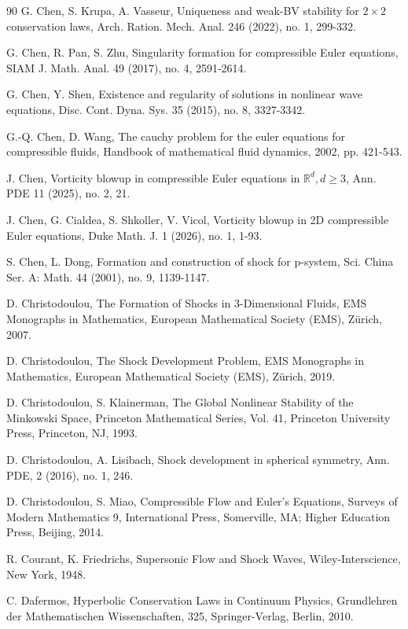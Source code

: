 \documentclass[11pt,reqno]{article}
\numberwithin{equation}{section}
\begin{document}
\begin{thebibliography}{90}
 G. Chen, S. Krupa, A. Vasseur, Uniqueness and weak-BV stability for $2\times2$ conservation laws, Arch. Ration. Mech. Anal. 246 (2022), no. 1, 299-332.

 G. Chen, R. Pan, S. Zhu, Singularity formation for compressible Euler equations, SIAM J. Math. Anal. 49 (2017), no. 4, 2591-2614.

 G. Chen, Y. Shen, Existence and regularity of solutions in nonlinear wave equations, Disc. Cont. Dyna. Sys. 35 (2015), no. 8, 3327-3342.


 G.-Q. Chen, D. Wang, The cauchy problem for the euler equations for compressible fluids, Handbook of mathematical fluid dynamics, 2002, pp. 421-543.

 J. Chen, Vorticity blowup in compressible Euler equations in $\mathbb{R}^d, d\geq3$, Ann. PDE 11 (2025), no. 2, 21.

 J. Chen, G. Cialdea, S. Shkoller, V. Vicol, Vorticity blowup in 2D compressible Euler equations, Duke Math. J. 1 (2026), no. 1, 1-93.

 S. Chen, L. Dong, Formation and construction of shock for p-system, Sci. China Ser. A: Math. 44 (2001), no. 9, 1139-1147.

 D. Christodoulou, The Formation of Shocks in 3-Dimensional Fluids, EMS Monographs in Mathematics, European Mathematical Society (EMS), Z\"urich, 2007.

 D. Christodoulou, The Shock Development Problem, EMS Monographs in Mathematics, European Mathematical Society (EMS), Z\"urich, 2019.

 D. Christodoulou, S. Klainerman, The Global Nonlinear Stability of the Minkowski Space, Princeton Mathematical Series, Vol. 41, Princeton University Press, Princeton, NJ, 1993.

 D. Christodoulou, A. Lisibach, Shock development in spherical symmetry, Ann. PDE, 2 (2016), no. 1, 246.

 D. Christodoulou, S. Miao, Compressible Flow and Euler's Equations, Surveys of Modern Mathematics 9, International Press, Somerville, MA; Higher Education Press, Beijing, 2014.

 R. Courant, K. Friedrichs, Supersonic Flow and Shock Waves, Wiley-Interscience, New York, 1948.

 C. Dafermos, Hyperbolic Conservation Laws in Continuum Physics, Grundlehren der Mathematischen Wissenschaften, 325, Springer-Verlag, Berlin, 2010.


\end{thebibliography}
\end{document}
